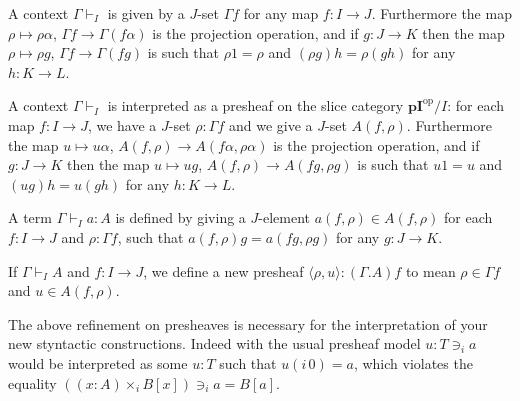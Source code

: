 \documentclass[english]{PaperTools/latex/lipics}
\newcommand\CTimes[2]{(#2) ×_{#1}}
\newcommand\op[1]{∋_{#1}}
\def\pI{\ensuremath{\mathbf{pI}}}
\def\opp{\mathrm{op}}
\begin{document}
\bigskip
A context $Γ ⊢_I$ is given by a $J$-set $Γf$ for any map $f : I → J$.
Furthermore the map $ρ ↦ ρα$, $Γf → Γ(fα)$ is the projection operation,
and if $g : J → K$ then the map $ρ ↦ ρg$, $Γf → Γ(fg)$ is such that
$ρ1 = ρ$ and $(ρg)h = ρ(gh)$ for any $h : K → L$.

\medskip
A context $Γ ⊢_I$ is interpreted as a presheaf on the slice category
$\pI^\opp/I$: for each map $f : I → J$, we have a $J$-set $ρ : Γf$ and
we give a $J$-set $A(f,ρ)$.
Furthermore the map $u ↦ uα$, $A(f,ρ) → A(fα,ρα)$ is the projection operation,
and if $g : J → K$ then the map $u ↦ ug$, $A(f,ρ) → A(fg,ρg)$ is such that
$u1 = u$ and $(ug)h = u(gh)$ for any $h : K → L$.

\medskip
A term $Γ ⊢_I a : A$ is defined by giving a $J$-element $a(f,ρ) ∈ A(f,ρ)$
for each $f: I → J$ and $ρ : Γf$, such that
$a(f,ρ)g = a(fg,ρg)$ for any $g : J → K$.

\medskip
If $Γ ⊢_I A$ and $f : I → J$, we define a new presheaf $⟨ρ,u⟩ : (Γ.A)f$
to mean $ρ ∈ Γf$ and $u ∈ A(f,ρ)$.

\bigskip
The above refinement on presheaves is necessary for the interpretation
of your new styntactic constructions.  Indeed with the usual presheaf model
$u : T \op i a$ would be interpreted as some $u : T$ such that $u(i\,0) = a$,
which violates the equality ${{(\CTimes i {x:A} B[x])} \op i a = B[a]}$.
\end{document}
